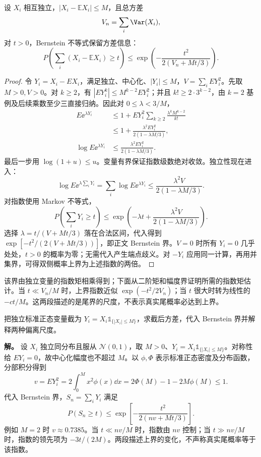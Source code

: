 \begin{proposition}
设 $X_i$ 相互独立，$|X_i-\mathbb E X_i|\le M$，且总方差
\[
V_n=\sum_i\Var(X_i),
\]
对 $t>0$，Bernstein 不等式保留方差信息：
\begin{equation}
P\!\left(
\sum_i(X_i-\mathbb E X_i)\ge t
\right)
\le
\exp\!\left(
-\frac{t^2}{2(V_n+Mt/3)}
\right).
\label{eq:math-stat-bernstein}
\end{equation}
\end{proposition}

\begin{proof}
令 $Y_i=X_i-EX_i$，满足独立、中心化、$|Y_i|\le M$，$V=\sum_iEY_i^2$。先取 $M>0,V>0$。对 $k\ge2$，有 $|EY_i^k|\le M^{k-2}EY_i^2$；并且 $k!\ge2\cdot3^{k-2}$，由 $k=2$ 基例及后续乘数至少三直接归纳。因此对 $0\le\lambda<3/M$，
\begin{align*}
 E\ee^{\lambda Y_i}
 &\le1+EY_i^2\sum_{k\ge2}\frac{\lambda^kM^{k-2}}{k!}\\
 &\le1+\frac{\lambda^2EY_i^2}{2(1-\lambda M/3)},\\
 \log E\ee^{\lambda Y_i}
 &\le\frac{\lambda^2EY_i^2}{2(1-\lambda M/3)}.
\end{align*}
最后一步用 $\log(1+u)\le u$。变量有界保证指数级数绝对收敛。独立性现在进入：
\[
 \log E\ee^{\lambda\sum_iY_i}
 =\sum_i\log E\ee^{\lambda Y_i}
 \le\frac{\lambda^2V}{2(1-\lambda M/3)}.
\]
对指数使用 Markov 不等式，
\[
 P\!\left(\sum_iY_i\ge t\right)
 \le\exp\left(-\lambda t+\frac{\lambda^2V}{2(1-\lambda M/3)}\right).
\]
选择 $\lambda=t/(V+Mt/3)$ 落在合法区间，代入得到 $\exp[-t^2/(2(V+Mt/3))]$，即正文 Bernstein 界。$V=0$ 时所有 $Y_i=0$ 几乎处处，$t>0$ 的概率为零；无需代入产生端点歧义。对 $-Y_i$ 应用同一计算，再用并集界，可得双侧概率上界为上述指数的两倍。
\end{proof}

该界由独立变量的指数矩相乘得到；下面从二阶矩和幅度界证明所需的指数矩估计。当 $t\ll V_n/M$ 时，上界指数近似 $\exp(-t^2/2V_n)$；当 $t$ 很大时转为线性的 $-ct/M$。这两段描述的是尾界的尺度，不表示真实尾概率必达到上界。

\begin{exbox}[有界截断中的方差尺度]
把独立标准正态变量截为 $Y_i=X_i\mathds1_{\{|X_i|\le M\}}$，求截后方差，代入 Bernstein 界并解释两种偏离尺度。

\textbf{解。} 设 $X_i$ 独立同分布且服从 $\mathcal N(0,1)$，取 $M>0$、$Y_i=X_i\mathds{1}_{\{|X_i|\le M\}}$。对称性给 $EY_i=0$，故中心化幅度也不超过 $M$。以 $\phi,\Phi$ 表示标准正态密度及分布函数，分部积分得到
\[
 v=EY_i^2=2\int_0^M x^2\phi(x)\dd x
 =2\Phi(M)-1-2M\phi(M)\le1.
\]
代入 Bernstein 界，$S_n=\sum_iY_i$ 满足
\[
 P(S_n\ge t)\le\exp\!\left[-\frac{t^2}{2(nv+Mt/3)}\right].
\]
例如 $M=2$ 时 $v\approx0.7385$。当 $t\ll nv/M$ 时，指数由 $nv$ 控制；当 $t\gg nv/M$ 时，指数的领先项为 $-3t/(2M)$。两段描述上界的变化，不声称真实尾概率等于该指数。
\end{exbox}

